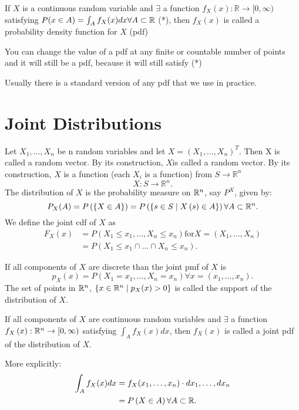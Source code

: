
If $X$ is a continuous random variable and $\exists $ a function $f_{X}(x) : \mathbb{R} \to [0,\infty)$ satisfying $P(x \in A) = \int_{A} f_{X} (x) dx   \forall   A \subset \mathbb{R}$ (*), then $f_{X}(x)$ is called a probability density function for $X$ (pdf) 

\begin{remark}
	You can change the value of a pdf at any finite or countable number of points and it will still be a pdf, because it will still satisfy (*)
\end{remark}

Usually there is a standard version of any pdf that we use in practice. 

\section{Joint Distributions}

Let $X_{1}, \ldots , X_{n}$ be n random variables and let $X = (X_{1}, \ldots , X_{n})^{T}$. Then X is called a random vector. By its construction, $X$is called a random vector. By its construction, $X$ is a function (each $X_{i}$ is a function) from $S \to \mathbb{R}^{n}$ \[
X : S \to \mathbb{R}^{n}
.\] 
The distribution of $X$ is the probability measure on $\mathbb{R}^{n}$, say $P^{X}$, given by: \[
	P_{X} (A) = P\left( \left\{ X \in  A  \right\}  \right)  = P\left( \left\{ s \in S  \mid X \left( s \right) \in  A \right\}  \right) \forall A \subset \mathbb{R}^{n}
.\] 
We define the joint cdf of $X$ as 
\begin{align*}
	F_{X}\left( x \right) &= P\left( X_{1} \le x_{1}, \ldots, X_{n}\le x_{n} \right) \text{for} X = (X_{1}, \ldots , X_{n}) \\
	&= P\left(  X_{1} \le x_{1} \cap  \ldots \cap  X_{n}\le x_{n} \right) 
.\end{align*}

If all components of $X$ are discrete than the joint pmf of $X$ is \[
	p_{X}(x) = P(X_{1} = x_{1}, \ldots, X_{n} = x_{n}) \forall x = \left( x_{1}, \ldots , x_{n} \right) 
.\] 
The set of points in $\mathbb{R}^{n}$, $\left\{ x \in  \mathbb{R}^{n} \mid p_{X}(x) > 0 \right\} $ is called the support of the distribution of $X$. 

If all components of $X$ are continuous random variables and $\exists $ a function $f_{X}\left( x \right)  : \mathbb{R}^{n} \to [0, \infty)$ satisfying $\int_{A} f_{X}(x) dx$, then $f_{X}(x)$ is called a joint pdf of the distribution of $X$. 

More explicitly: 
\begin{align*}
	\int_{A}^{} f_{X} (x) dx &= f_{X} (x_{1}, \ldots, x_{n}) \cdot dx_{1}, \ldots , dx_{n}\\
				 &= P\left( X \in A \right)  \forall A \subset \mathbb{R} 
.\end{align*}
